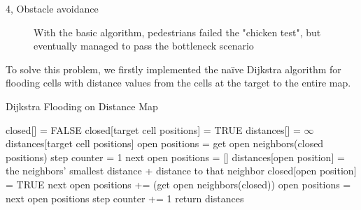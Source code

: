 \documentclass[10pt,a4paper]{article}
\begin{document}
\begin{task}{4, Obstacle avoidance}
\begin{figure} [!h]
 \centering
 \caption{With the basic algorithm, pedestrians failed the "chicken test", but eventually managed to pass the bottleneck scenario}
 \label{f42}
\end{figure}

To solve this problem, we firstly implemented the na\"ive Dijkstra algorithm for flooding cells with distance values from the cells at the target to the entire map. 

\begin{algorithm}[H]
	\caption{Dijkstra Flooding on Distance Map} 
	\label{alg:update_ste}
	\begin{algorithmic}[1]
	    \State closed[] = FALSE
	    \State closed[target cell positions] = TRUE
	    \State distances[] = $\infty$
	    \State distances[target cell positions]
	    \State open positions = get open neighbors(closed positions)
	    \State step counter = 1
		    \State next open positions = []
			    \State distances[open position] = the neighbors' smallest distance + distance to that neighbor
			    \State closed[open position] = TRUE
			    \State next open positions += (get open neighbors(closed))
			\EndFor
			\State open positions = next open positions
			\State step counter += 1
		\EndWhile
	    \State return distances
	\end{algorithmic} 
\end{algorithm}


\end{task}
\end{document}
